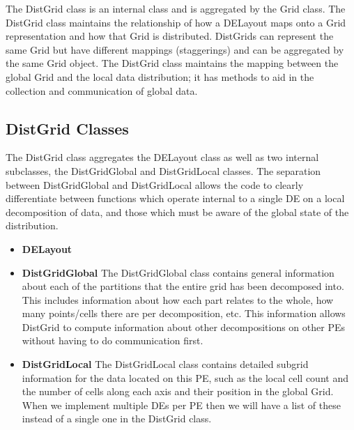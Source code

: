 %



The DistGrid class is an internal class and is aggregated by the Grid class.
The DistGrid class maintains the relationship of how a DELayout maps onto
a Grid representation and how that Grid is distributed.  DistGrids can
represent the same Grid but have different mappings (staggerings) and can
be aggregated by the same Grid object. The DistGrid class maintains the
mapping between the global Grid and the local data distribution;  it has
methods to aid in the collection and communication of global data.

\subsection{DistGrid Classes}
The DistGrid class aggregates the DELayout class as well as two internal subclasses,
the DistGridGlobal and DistGridLocal classes.  The separation between DistGridGlobal
and DistGridLocal allows the code to clearly differentiate between functions which
operate internal to a single DE on a local decomposition of data, and those which
must be aware of the global state of the distribution.
\begin{itemize}
\item {\bf DELayout}
\item {\bf DistGridGlobal} The DistGridGlobal class contains general information
about each of the partitions that the entire grid has been decomposed into. This
includes information about how each part relates to the whole, how many points/cells
there are per decomposition, etc.  This information allows DistGrid to compute
information about other decompositions on other PEs without having to do communication
first.
\item {\bf DistGridLocal} The DistGridLocal class contains detailed subgrid
information for the data located on this PE, such as the local cell count and the
number of cells along each axis and their position in the global Grid.  When we
implement multiple DEs per PE then we will have a list of these instead of a single
one in the DistGrid class.
\end{itemize}



